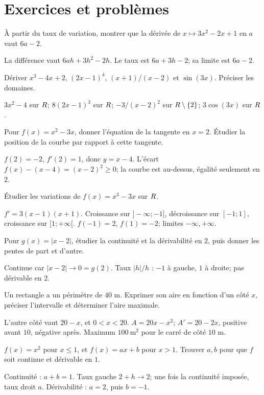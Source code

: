 \section{Exercices et problèmes}
\label{t11s-c04-e01}
À partir du taux de variation, montrer que la dérivée de $x\mapsto3x^2-2x+1$ en $a$ vaut $6a-2$.
\begin{corrige}\label{sol-t11s-c04-e01}
La différence vaut $6ah+3h^2-2h$. Le taux est $6a+3h-2$; sa limite est $6a-2$.
\end{corrige}
\exo[Dériver]\label{t11s-c04-e02}
Dériver $x^3-4x+2$, $(2x-1)^4$, $(x+1)/(x-2)$ et $\sin(3x)$. Préciser les domaines.
\begin{corrige}\label{sol-t11s-c04-e02}
$3x^2-4$ sur $R$; $8(2x-1)^3$ sur $R$; $-3/(x-2)^2$ sur $R\setminus\{2\}$; $3\cos(3x)$ sur $R$.
\end{corrige}
\exo[Tangente]\label{t11s-c04-e03}
Pour $f(x)=x^2-3x$, donner l’équation de la tangente en $x=2$. Étudier la position de la courbe par rapport à cette tangente.
\begin{corrige}\label{sol-t11s-c04-e03}
$f(2)=-2$, $f'(2)=1$, donc $y=x-4$. L’écart $f(x)-(x-4)=(x-2)^2\ge0$; la courbe est au-dessus, égalité seulement en $2$.
\end{corrige}
\exo[Variations]\label{t11s-c04-e04}
Étudier les variations de $f(x)=x^3-3x$ sur $R$.
\begin{corrige}\label{sol-t11s-c04-e04}
$f'=3(x-1)(x+1)$. Croissance sur $]-\infty;-1]$, décroissance sur $[-1;1]$, croissance sur $[1;+\infty[$. $f(-1)=2$, $f(1)=-2$; limites $-\infty,+\infty$.
\end{corrige}
\label{t11s-c04-e05}
Pour $g(x)=|x-2|$, étudier la continuité et la dérivabilité en $2$, puis donner les pentes de part et d’autre.
\begin{corrige}\label{sol-t11s-c04-e05}
Continue car $|x-2|\to0=g(2)$. Taux $|h|/h$ : $-1$ à gauche, $1$ à droite; pas dérivable en $2$.
\end{corrige}
\exo[Optimiser]\label{t11s-c04-e06}
Un rectangle a un périmètre de $40$ m. Exprimer son aire en fonction d’un côté $x$, préciser l’intervalle et déterminer l’aire maximale.
\begin{corrige}\label{sol-t11s-c04-e06}
L’autre côté vaut $20-x$, et $0<x<20$. $A=20x-x^2$; $A'=20-2x$, positive avant $10$, négative après. Maximum $100\ \mathrm{m}^2$ pour le carré de côté $10$ m.
\end{corrige}
\label{t11s-c04-e07}
$f(x)=x^2$ pour $x\le1$, et $f(x)=ax+b$ pour $x>1$. Trouver $a,b$ pour que $f$ soit continue et dérivable en $1$.
\begin{corrige}\label{sol-t11s-c04-e07}
Continuité : $a+b=1$. Taux gauche $2+h\to2$; une fois la continuité imposée, taux droit $a$. Dérivabilité : $a=2$, puis $b=-1$.
\end{corrige}

